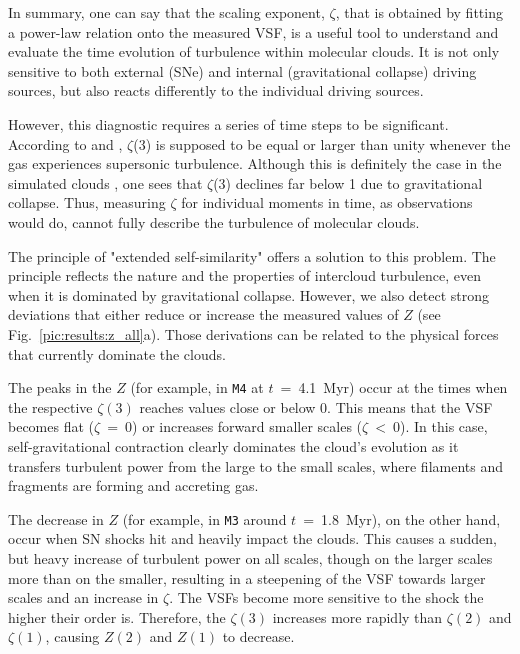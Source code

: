 In summary, one can say that the scaling exponent, $\zeta$, that is obtained by fitting a power-law relation onto the measured VSF, is a useful tool to understand and evaluate the time evolution of turbulence within molecular clouds. 
It is not only sensitive to both external (SNe) and internal (gravitational collapse) driving sources, but also reacts differently to the individual driving sources. 

However, this diagnostic requires a series of time steps to be significant.
According to \citet{She1994} and \citet{Boldyrev2002}, $\zeta$(3) is supposed to be equal or larger than unity whenever the gas experiences supersonic turbulence.
Although this is definitely the case in the simulated clouds , one sees that $\zeta$(3) declines far below 1 due to gravitational collapse.
Thus, measuring $\zeta$ for individual moments in time, as observations would do, cannot fully describe the turbulence of molecular clouds.

The principle of "extended self-similarity" \citep[Sect.~\ref{methods:vsf}]{Benzi1993} offers a solution to this problem.
The principle reflects the nature and the properties of intercloud turbulence, even when it is dominated by gravitational collapse.
However, we also detect strong deviations that either reduce or increase the measured values of $Z$ (see Fig.~\ref{pic:results:z_all}a).
Those derivations can be related to the physical forces that currently dominate the clouds.

The peaks in the $Z$ (for example, in \texttt{M4} at $t$~=~4.1~Myr) occur at the times when the respective $\zeta(3)$ reaches values close or below 0.
This means that the VSF becomes flat ($\zeta$~=~0) or increases forward smaller scales ($\zeta~<~0$). 
In this case, self-gravitational contraction clearly dominates the cloud's evolution as it transfers turbulent power from the large to the small scales, where filaments and fragments are forming and accreting gas.

The decrease in $Z$ (for example, in \texttt{M3} around $t$~=~1.8~Myr), on the other hand, occur when SN shocks hit and heavily impact the clouds. 
This causes a sudden, but heavy increase of turbulent power on all scales, though on the larger scales more than on the smaller, resulting in a steepening of the VSF towards larger scales and an increase in $\zeta$.
The VSFs become more sensitive to the shock the higher their order is.
Therefore, the $\zeta(3)$ increases more rapidly than $\zeta(2)$ and $\zeta(1)$, causing $Z(2)$ and $Z(1)$ to decrease.

